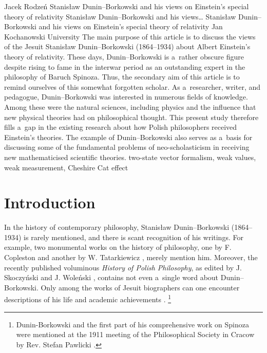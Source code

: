 \begin{artengenv}{Jacek Rodzeń}
	{Stanisław Dunin–Borkowski and his views on Einstein's special theory of relativity}
	{Stanisław Dunin–Borkowski and his views\ldots}
	{Stanisław Dunin–Borkowski and his views on Einstein's special theory of relativity}
	{Jan Kochanowski University}
	{The main purpose of this article is to discuss the views of the Jesuit Stanisław Dunin–Borkowski (1864–1934) about Albert Einstein's theory of relativity. These days, Dunin–Borkowski is a~rather obscure figure despite rising to fame in the interwar period as an outstanding expert in the philosophy of Baruch Spinoza. Thus, the secondary aim of this article is to remind ourselves of this somewhat forgotten scholar. As a~researcher, writer, and pedagogue, Dunin–Borkowski was interested in numerous fields of knowledge. Among these were the natural sciences, including physics and the influence that new physical theories had on philosophical thought. This present study therefore fills a~gap in the existing research about how Polish philosophers received Einstein's theories. The example of Dunin–Borkowski also serves as a~basis for discussing some of the fundamental problems of neo-scholasticism in receiving new mathematicised scientific theories.}
	{two-state vector formalism, weak values, weak measurement, Cheshire Cat effect}





\section{Introduction}
\lettrine[loversize=0.13,lines=2,lraise=-0.01,nindent=0em,findent=0.2pt]%
{I}{}n the history of contemporary philosophy, Stanisław Dunin–Borkowski (1864–1934) is rarely mentioned, and there is scant recognition of his writings. For example, two monumental works on the history of philosophy, one by F. Copleston
\parencite*[][p.209]{copleston_history_1994} %
 and another by W. Tatarkiewicz 
\parencite[][p.365]{tatarkiewicz_historia_1998}, %
 merely mention him. Moreover, the recently published voluminous \textit{History of Polish Philosophy}, as edited by J. Skoczyński and J. Woleński 
\parencite*[][]{skoczynski_historia_2010}, %
 contains not even a~single word about Dunin–Borkowski. Only among the works of Jesuit biographers can one encounter descriptions of his life and academic achievements 
\parencites[cf.][]{siwek_stanislaw_1935}[][]{pummerer_p_1935}[][pp.103–104]{darowski_filozofia_2001}.%
\footnote{Dunin-Borkowski and the first part of his comprehensive work on Spinoza were mentioned at the 1911 meeting of the Philosophical Society in Cracow by Rev. Stefan Pawlicki 
\parencite*[][pp.13–14]{pawlicki_spinoza_1912}.%
}


\end{artengenv}
